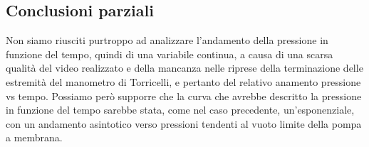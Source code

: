 
\subsection{Conclusioni parziali}

Non siamo riusciti purtroppo ad analizzare l'andamento della pressione in funzione del tempo, quindi di una variabile continua, a causa di una scarsa qualità del video realizzato e della mancanza nelle riprese della terminazione delle estremità del manometro di Torricelli, e pertanto del relativo anamento pressione vs tempo. Possiamo però supporre che la curva che avrebbe descritto la pressione in funzione del tempo sarebbe stata, come nel caso precedente, un'esponenziale, con un andamento asintotico verso pressioni tendenti al vuoto limite della pompa a membrana.